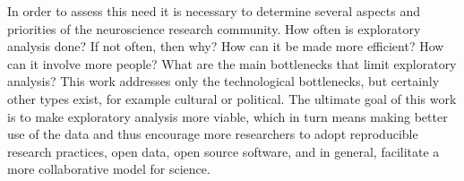 In order to assess this need it is necessary to determine several aspects and priorities of the neuroscience research community. How often is exploratory analysis done? If not often, then why? How can it be made more efficient? How can it involve more people? What are the main bottlenecks that limit exploratory analysis? This work addresses only the technological bottlenecks, but certainly other types exist, for example cultural or political. The ultimate goal of this work is to make exploratory analysis more viable, which in turn means making better use of the data and thus encourage more researchers to adopt reproducible research practices, open data, open source software, and in general, facilitate a more collaborative model for science.



